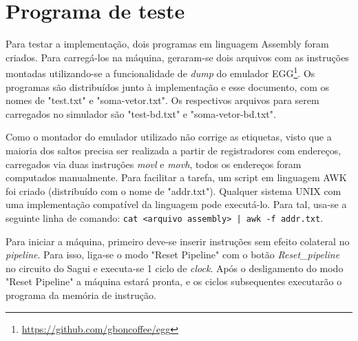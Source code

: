 \documentclass{article}
\begin{document}
\section{Programa de teste}

Para testar a implementação, dois programas em linguagem Assembly foram criados.
Para carregá-los na máquina, geraram-se dois arquivos com as instruções montadas
utilizando-se a funcionalidade de \textit{dump} do emulador
EGG\footnote{\url{https://github.com/gboncoffee/egg}}. Os programas são
distribuídos junto à implementação e esse documento, com os nomes de "test.txt"
e "soma-vetor.txt". Os respectivos arquivos para serem carregados no simulador
são "test-bd.txt" e "soma-vetor-bd.txt".

Como o montador do emulador utilizado não corrige as etiquetas, visto que a
maioria dos saltos precisa ser realizada a partir de registradores com
endereços, carregados via duas instruções \textit{movl} e \textit{movh}, todos
os endereços foram computados manualmente. Para facilitar a tarefa, um script em
linguagem AWK foi criado (distribuído com o nome de "addr.txt"). Qualquer
sistema UNIX com uma implementação compatível da linguagem pode executá-lo. Para
tal, usa-se a seguinte linha de comando:
\verb=cat <arquivo assembly> | awk -f addr.txt=.

Para iniciar a máquina, primeiro deve-se inserir instruções sem efeito colateral
no \textit{pipeline}. Para isso, liga-se o modo "Reset Pipeline" com o botão
\textit{Reset\_pipeline} no circuito do Sagui e executa-se 1 ciclo de
\textit{clock}. Após o desligamento do modo "Reset Pipeline" a máquina estará
pronta, e os ciclos subsequentes executarão o programa da memória de instrução.
\end{document}
